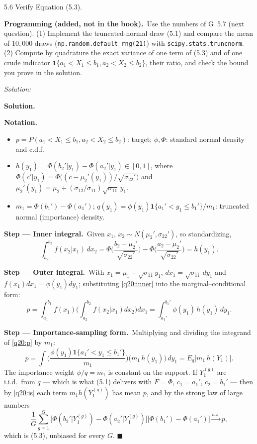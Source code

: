 \documentclass[11pt,a4paper]{article}
\newif\ifsolucoes
\newcommand{\espacoresol}{4.5cm}   %
\numberwithin{equation}{questao}   %
\newcommand{\programacao}{\par\smallskip\noindent\textbf{Programming (added, not in the book).}~}
\newenvironment{notacao}{\par\smallskip\noindent\textbf{Notation.}\begin{itemize}[leftmargin=1.4em,topsep=1pt,itemsep=0pt]\small}{\end{itemize}}
\newcommand{\resolespaco}{\ifsolucoes\else\par\textit{Solution:}\vspace{\espacoresol}\par\fi}
\newcommand{\passo}[2]{\par\smallskip\noindent\textbf{Step --- #1.}~#2}
\newcommand{\solhead}{\par\medskip\noindent{\color{blue!55!black}\rule{\linewidth}{0.3pt}}\par\noindent\textbf{Solution.}}
\newcommand{\1}{\mathbf{1}}
\begin{document}
5.6 Verify Equation (5.3).
\programacao Use the numbers of G~5.7 (next question). (1) Implement the truncated-normal draw
(5.1) and compare the mean of $10{,}000$ draws (\texttt{np.random.default\_rng(21)}) with
\texttt{scipy.stats.truncnorm}. (2) Compute by quadrature the exact variance of one term of (5.3)
and of one crude indicator $\1\{a_1<X_1\le b_1,a_2<X_2\le b_2\}$, their ratio, and check the bound
you prove in the solution.
\resolespaco
\begin{sol}
\solhead
\begin{notacao}
\item $p=P(a_1<X_1\le b_1,a_2<X_2\le b_2)$: target; $\phi,\Phi$: standard normal density and c.d.f.
\item $h(y_1)=\Phi(b_2'|y_1)-\Phi(a_2'|y_1)\in[0,1]$, where $\Phi(c'|y_1)=\Phi\big((c-\mu_2'(y_1))/\sqrt{\sigma_{22}'}\big)$
  and $\mu_2'(y_1)=\mu_2+(\sigma_{12}/\sigma_{11})\sqrt{\sigma_{11}}\,y_1$.
\item $m_1=\Phi(b_1')-\Phi(a_1')$; $q(y_1)=\phi(y_1)\1\{a_1'<y_1\le b_1'\}/m_1$: truncated normal (importance) density.
\end{notacao}

\passo{Inner integral}{Given $x_1$, $x_2\sim N(\mu_2',\sigma_{22}')$, so standardizing,}
\begin{equation}\label{q20:inner}
\int_{a_2}^{b_2}f(x_2|x_1)\,dx_2=\Phi\Big(\frac{b_2-\mu_2'}{\sqrt{\sigma_{22}'}}\Big)-\Phi\Big(\frac{a_2-\mu_2'}{\sqrt{\sigma_{22}'}}\Big)=h(y_1).
\end{equation}

\passo{Outer integral}{With $x_1=\mu_1+\sqrt{\sigma_{11}}y_1$, $dx_1=\sqrt{\sigma_{11}}\,dy_1$ and
$f(x_1)dx_1=\phi(y_1)dy_1$; substituting \eqref{q20:inner} into the marginal--conditional form:}
\begin{equation}\label{q20:p}
p=\int_{a_1}^{b_1}f(x_1)\Big(\int_{a_2}^{b_2}f(x_2|x_1)dx_2\Big)dx_1=\int_{a_1'}^{b_1'}\phi(y_1)\,h(y_1)\,dy_1 .
\end{equation}

\passo{Importance-sampling form}{Multiplying and dividing the integrand of \eqref{q20:p} by $m_1$:}
\begin{equation}\label{q20:is}
p=\int\Big(\frac{\phi(y_1)\1\{a_1'<y_1\le b_1'\}}{m_1}\Big)\big(m_1\,h(y_1)\big)\,dy_1=E_q\big[m_1\,h(Y_1)\big].
\end{equation}
The importance weight $\phi/q=m_1$ is constant on the support. If $Y_1^{(g)}$ are i.i.d.\ from $q$ ---
which is what (5.1) delivers with $F=\Phi$, $c_1=a_1'$, $c_2=b_1'$ --- then by \eqref{q20:is} each term
$m_1h(Y_1^{(g)})$ has mean $p$, and by the strong law of large numbers
\[
\frac1G\sum_{g=1}^G\big[\Phi(b_2'|Y_1^{(g)})-\Phi(a_2'|Y_1^{(g)})\big]\big[\Phi(b_1')-\Phi(a_1')\big]\xrightarrow{a.s.}p,
\]
which is (5.3), unbiased for every $G$. $\blacksquare$


\end{sol}
\end{document}
